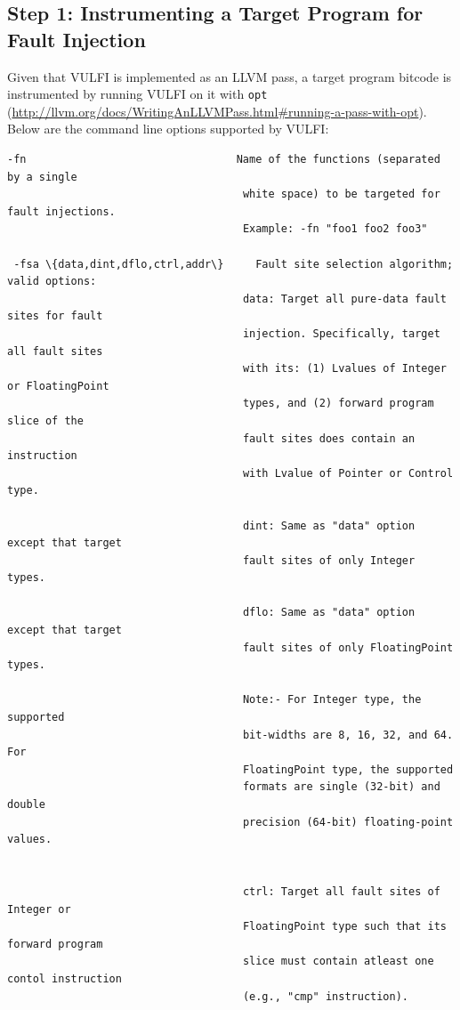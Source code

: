 \documentclass[12pt,a4paper]{article}
\begin{document}
\subsection{Step 1: Instrumenting a Target Program for Fault Injection}
Given that VULFI is implemented as an LLVM pass, a target program bitcode
is instrumented by running VULFI on it with \texttt{opt}
(\url{http://llvm.org/docs/WritingAnLLVMPass.html#running-a-pass-with-opt}).
Below are the command line options supported by VULFI:

\begin{Verbatim}[fontsize=\relsize{-1},frame=single,framerule=0.1mm,commandchars=\\\{\}]
 -fn                                 Name of the functions (separated by a single 
                                     white space) to be targeted for fault injections.
                                     Example: -fn "foo1 foo2 foo3"
             
 -fsa \{data,dint,dflo,ctrl,addr\}     Fault site selection algorithm; valid options:
                                     data: Target all pure-data fault sites for fault 
                                     injection. Specifically, target all fault sites 
                                     with its: (1) Lvalues of Integer or FloatingPoint 
                                     types, and (2) forward program slice of the 
                                     fault sites does contain an instruction 
                                     with Lvalue of Pointer or Control type.
                                     
                                     dint: Same as "data" option except that target 
                                     fault sites of only Integer types.
                                     
                                     dflo: Same as "data" option except that target 
                                     fault sites of only FloatingPoint types.
                                     
                                     Note:- For Integer type, the supported 
                                     bit-widths are 8, 16, 32, and 64. For 
                                     FloatingPoint type, the supported 
                                     formats are single (32-bit) and double 
                                     precision (64-bit) floating-point values.
                                  
                                     
                                     ctrl: Target all fault sites of Integer or 
                                     FloatingPoint type such that its forward program 
                                     slice must contain atleast one contol instruction 
                                     (e.g., "cmp" instruction).
                                     

\end{Verbatim}
\end{document}
